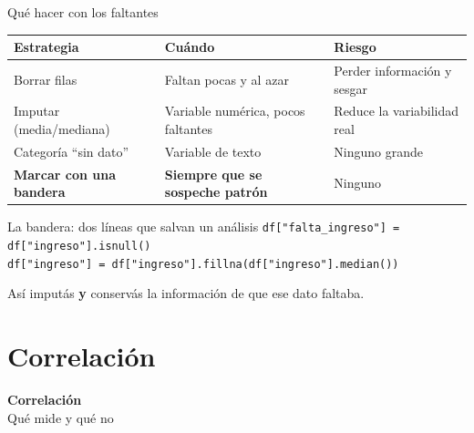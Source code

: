 \documentclass[aspectratio=169,10pt]{beamer}
\begin{document}
\begin{frame}{Qué hacer con los faltantes}
  \begin{center}
  \begin{tabular}{lll}
    \toprule
    \textbf{Estrategia} & \textbf{Cuándo} & \textbf{Riesgo} \\
    \midrule
    Borrar filas    & Faltan pocas y al azar    & Perder información y sesgar \\
    Imputar (media/mediana) & Variable numérica, pocos faltantes & Reduce la variabilidad real \\
    Categoría ``sin dato''  & Variable de texto         & Ninguno grande \\
    \textbf{Marcar con una bandera} & \textbf{Siempre que se sospeche patrón} & Ninguno \\
    \bottomrule
  \end{tabular}
  \end{center}
  \vspace{0.6em}
  \begin{exampleblock}{La bandera: dos líneas que salvan un análisis}
    \texttt{df["falta\_ingreso"] = df["ingreso"].isnull()} \\
    \texttt{df["ingreso"] = df["ingreso"].fillna(df["ingreso"].median())}
  \end{exampleblock}
  \begin{center}\small Así imputás \textbf{y} conservás la información de que ese dato faltaba.\end{center}
\end{frame}

\section{Correlación}

{
\begin{frame}[plain]
  \begin{center}
    {\Huge\bfseries\color{violetaOscuro} Correlación}\\[0.6em]
    {\large Qué mide y qué no}
  \end{center}
\end{frame}}
\end{document}
